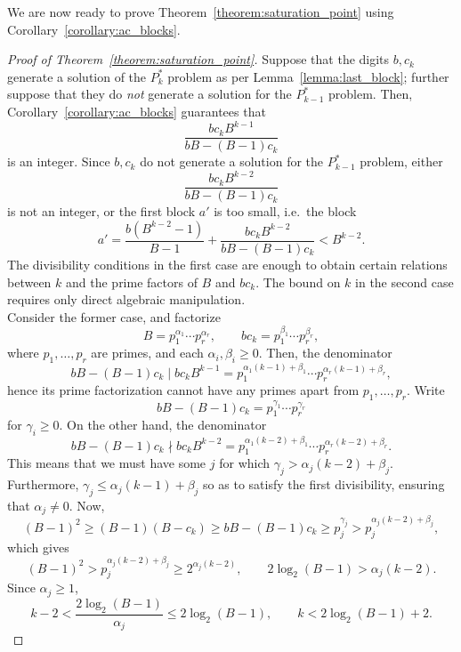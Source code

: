 \documentclass[sn-mathphys]{sn-jnl}%
\theoremstyle{thmstyleone}%
\theoremstyle{thmstyletwo}%
\theoremstyle{thmstylethree}%
\begin{document}
\begin{appendices}

We are now ready to prove Theorem~\ref{theorem:saturation_point} using
Corollary~\ref{corollary:ac_blocks}.

\begin{proof}[Proof of Theorem~\ref{theorem:saturation_point}]
    Suppose that the digits $b, c_k$ generate a solution of the $P^*_k$ problem
    as per Lemma~\ref{lemma:last_block}; further suppose that they do \emph{not}
    generate a solution for the $P^*_{k - 1}$ problem.
    Then, Corollary~\ref{corollary:ac_blocks} guarantees that \[
        \frac{bc_kB^{k - 1}}{bB - (B - 1)c_k}
    \] is an integer. Since $b, c_k$ do not generate a solution for the $P^*_{k - 1}$
    problem, either \[
        \frac{bc_kB^{k - 2}}{bB - (B - 1)c_k}
    \] is not an integer, or the first block $a'$ is too small, i.e.\ the block \[ 
        a' = \frac{b(B^{k - 2} - 1)}{B - 1} + \frac{bc_kB^{k - 2}}{bB - (B - 1)c_k} 
        < B^{k - 2}.
    \] The divisibility conditions in the first case are enough to obtain certain relations
    between $k$ and the prime factors of $B$ and $bc_k$.
    The bound on $k$ in the second case requires only direct algebraic manipulation. \\
    
    Consider the former case, and factorize \[
        B = p_1^{\alpha_1}\cdots p_r^{\alpha_r}, \qquad
        bc_k = p_1^{\beta_1}\cdots p_r^{\beta_r},
    \] where $p_1, \dots, p_r$ are primes, and each $\alpha_i, \beta_i \geq 0$. Then, the
    denominator \[
        bB - (B - 1)c_k \mid bc_kB^{k - 1} = p_1^{\alpha_1(k - 1) + \beta_1}\cdots
        p_r^{\alpha_r(k - 1) + \beta_r},
    \] hence its prime factorization cannot have any primes apart from $p_1,\dots, p_r$.
    Write \[
        bB - (B - 1)c_k = p_1^{\gamma_1}\cdots p_r^{\gamma_r}
    \] for $\gamma_i \geq 0$. On the other hand, the denominator \[
        bB - (B - 1)c_k \nmid bc_kB^{k - 2} = p_1^{\alpha_1(k - 2) + \beta_1}\cdots
        p_r^{\alpha_r(k - 2) + \beta_r}.
    \] This means that we must have some $j$ for which $\gamma_j > \alpha_j(k - 2) + 
    \beta_j$. Furthermore, $\gamma_j \leq \alpha_j(k - 1) + \beta_j$ so as to satisfy
    the first divisibility, ensuring that $\alpha_j \neq 0$. Now, \[
        (B - 1)^2 \geq (B - 1)(B - c_k) \geq bB - (B - 1)c_k \geq p_j^{\gamma_j} 
        > p_j^{\alpha_j(k - 2) + \beta_j},
    \] which gives \[
        (B - 1)^2 > p_j^{\alpha_j(k - 2) + \beta_j} \geq 2^{\alpha_j(k - 2)}, \qquad
        2\log_2(B - 1) > \alpha_j(k - 2).
    \] Since $\alpha_j \geq 1$, \[
        k - 2 < \frac{2\log_2(B - 1)}{\alpha_j} \leq 2\log_2(B - 1), \qquad
        k < 2\log_2(B - 1) + 2.
    \]
    

\end{proof}
\end{appendices}
\end{document}
